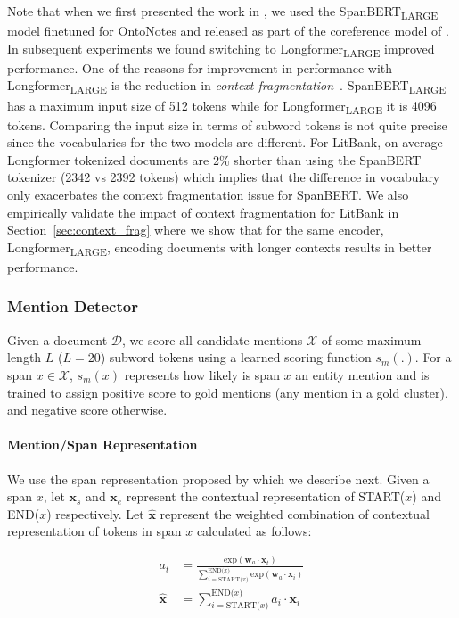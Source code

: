 \documentclass[12pt]{thesis-umich}[thesis]
\def\vec#1{\ensuremath{\boldsymbol{{#1}}}}
\begin{document}
Note that when we first presented the work in \citet{toshniwal-etal-2020-learning}, we used the SpanBERT\textsubscript{LARGE} model finetuned for OntoNotes and released as part of the coreference model of \citet{joshi-etal-2020-spanbert}. In subsequent experiments we found switching to Longformer\textsubscript{LARGE} improved performance. One of the reasons for improvement in performance with Longformer\textsubscript{LARGE} is the reduction in \emph{context fragmentation}~\cite{dai-etal-2019-transformer}. SpanBERT\textsubscript{LARGE} has a maximum input size of 512 tokens while for Longformer\textsubscript{LARGE} it is 4096 tokens. Comparing the input size in terms of subword tokens is not quite precise since the vocabularies for the two models are different.  For LitBank, on average Longformer tokenized documents are 2\% shorter than using the SpanBERT tokenizer (2342 vs 2392 tokens) which implies that the difference in vocabulary only exacerbates the context fragmentation issue for SpanBERT. 
We also empirically validate the impact of context fragmentation for LitBank in Section~\ref{sec:context_frag} where we show that for the same encoder, Longformer\textsubscript{LARGE}, encoding documents with longer contexts results in better performance.  

\subsubsection{Mention Detector}
\label{sec:ment_proposal}
Given a document $\mathcal{D}$, we score all candidate mentions $\mathcal{X}$ of some maximum length $L$ ($L = 20$) subword tokens using a learned scoring function $s_m(.)$. 
For a span $x \in \mathcal{X}$, $s_m(x)$ represents how likely is span $x$ an entity mention and is trained to assign positive score to gold mentions (any mention in a gold cluster), and negative score otherwise.

\paragraph{Mention/Span Representation} We use the span representation proposed by \citet{lee-etal-2017-end} which we describe next. Given a span $x$, let $\vec{x}_s$ and $\vec{x}_e$ represent the contextual representation of START($x$) and END($x$) respectively. Let $\hat{\vec{x}}$ represent the weighted combination of contextual representation of tokens in span   $x$ calculated as follows:

\begin{align*}
    a_t &= \frac{\textrm{exp}(\vec{w}_a \cdot \vec{x}_t)}{\sum\limits_{i=\textrm{START(}x\textrm{)}}^{\textrm{END(}x\textrm{)}} \textrm{exp}(\vec{w}_a \cdot \vec{x}_i)}\\
    \hat{\vec{x}} &= \sum_{i=\textrm{START(}x\textrm{)}}^{\textrm{END(}x\textrm{)}} a_i \cdot \vec{x}_i
\end{align*}
\end{document}
